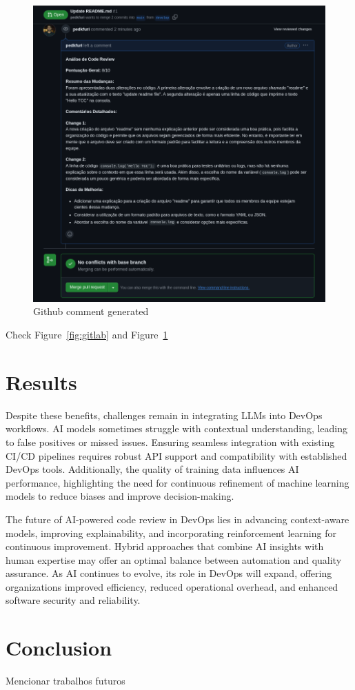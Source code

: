 \documentclass[12pt]{article}
\begin{document}
\begin{figure}[htbp]
    \centering
    \includegraphics[width=1\textwidth]{github.png}
    \caption{Github comment generated}
    \label{fig:github}
\end{figure}

Check Figure~\ref{fig:gitlab} and Figure~\ref{fig:github} 

\section{Results}
Despite these benefits, challenges remain in integrating LLMs into DevOps workflows. AI models sometimes struggle with contextual understanding, leading to false positives or missed issues. Ensuring seamless integration with existing CI/CD pipelines requires robust API support and compatibility with established DevOps tools. Additionally, the quality of training data influences AI performance, highlighting the need for continuous refinement of machine learning models to reduce biases and improve decision-making. \cite{integratingAIDevops}
    
The future of AI-powered code review in DevOps lies in advancing context-aware models, improving explainability, and incorporating reinforcement learning for continuous improvement. Hybrid approaches that combine AI insights with human expertise may offer an optimal balance between automation and quality assurance. As AI continues to evolve, its role in DevOps will expand, offering organizations improved efficiency, reduced operational overhead, and enhanced software security and reliability. \cite{intelligentDevops}

\section{Conclusion}
Mencionar trabalhos futuros



\end{document}
